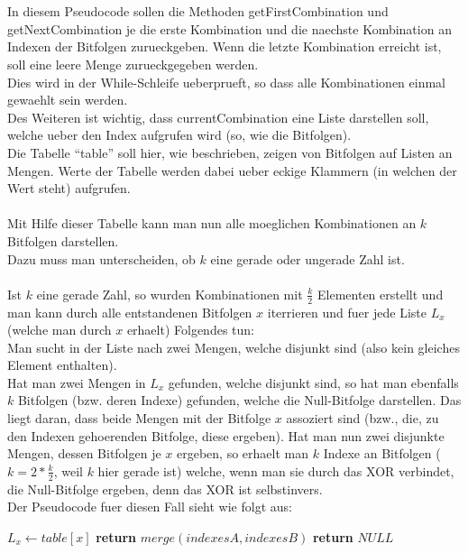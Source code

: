 \documentclass[a4paper,10pt,ngerman]{scrartcl}
\begin{document}
\\\\
In diesem Pseudocode sollen die Methoden getFirstCombination und getNextCombination je die erste Kombination und die naechste Kombination an Indexen der Bitfolgen zurueckgeben. Wenn die letzte Kombination erreicht ist, soll eine leere Menge zurueckgegeben werden.\\
Dies wird in der While-Schleife ueberprueft, so dass alle Kombinationen einmal gewaehlt sein werden.\\
Des Weiteren ist wichtig, dass currentCombination eine Liste darstellen soll, welche ueber den Index aufgrufen wird (so, wie die Bitfolgen).\\
Die Tabelle "`table"' soll hier, wie beschrieben, zeigen von Bitfolgen auf Listen an Mengen. Werte der Tabelle werden dabei ueber eckige Klammern (in welchen der Wert steht) aufgrufen.
\\\\
Mit Hilfe dieser Tabelle kann man nun alle moeglichen Kombinationen an $k$ Bitfolgen darstellen.\\
Dazu muss man unterscheiden, ob $k$ eine gerade oder ungerade Zahl ist.
\\\\
Ist $k$ eine gerade Zahl, so wurden Kombinationen mit $\frac{k}{2}$ Elementen erstellt und man kann durch alle entstandenen Bitfolgen $x$ iterrieren und fuer jede Liste $L_x$ (welche man durch $x$ erhaelt) Folgendes tun:\\
Man sucht in der Liste nach zwei Mengen, welche disjunkt sind (also kein gleiches Element enthalten). 
\\Hat man zwei Mengen in $L_x$ gefunden, welche disjunkt sind, so hat man ebenfalls $k$ Bitfolgen (bzw. deren Indexe) gefunden, welche die Null-Bitfolge darstellen. Das liegt daran,
dass beide Mengen mit der Bitfolge $x$ assoziert sind (bzw., die, zu den Indexen gehoerenden Bitfolge, diese ergeben). Hat man nun zwei disjunkte Mengen, dessen Bitfolgen je $x$ ergeben, 
so erhaelt man $k$ Indexe an Bitfolgen ($k = 2*\frac{k}{2}$, weil $k$ hier gerade ist) welche, wenn man sie durch das XOR verbindet, die Null-Bitfolge ergeben, denn 
das XOR ist selbstinvers.\\
Der Pseudocode fuer diesen Fall sieht wie folgt aus:
\begin{algorithmic}[1]
					\State $L_x \gets table[x]$
												\State \textbf{return} $merge(indexesA, indexesB)$
									\EndIf
							\EndFor
					\EndFor
		\EndFor
		\State \textbf{return} $NULL$
\EndProcedure
\end{algorithmic}
\\
\end{document}
